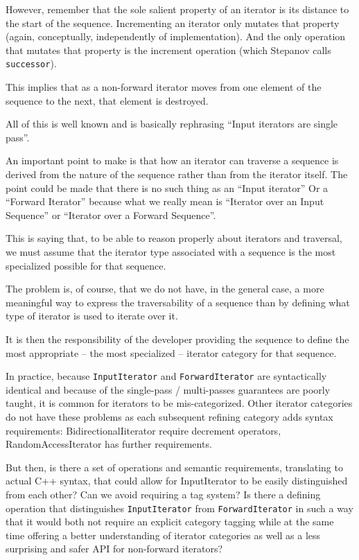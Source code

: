 \documentclass{wg21}
\begin{document}
However, remember that the sole salient property of an iterator is its
distance to the start of the sequence. Incrementing an iterator only
mutates that property (again, conceptually, independently of
implementation). And the only operation that mutates that property is
the increment operation (which Stepanov calls \texttt{successor}).

This implies that as a non-forward iterator moves from one element of
the sequence to the next, that element is destroyed.

All of this is well known and is basically rephrasing ``Input iterators
are single pass''.

An important point to make is that how an iterator can traverse a
sequence is derived from the nature of the sequence rather than from the
iterator itself. The point could be made that there is no such thing as
an ``Input iterator'' Or a ``Forward Iterator'' because what we really
mean is ``Iterator over an Input Sequence'' or ``Iterator over a Forward
Sequence''.

This is saying that, to be able to reason properly about iterators and
traversal, we must assume that the iterator type associated with a
sequence is the most specialized possible for that sequence.

The problem is, of course, that we do not have, in the general case, a
more meaningful way to express the traversability of a sequence than by
defining what type of iterator is used to iterate over it.

It is then the responsibility of the developer providing the sequence to
define the most appropriate -- the most specialized -- iterator category
for that sequence.

In practice, because \texttt{InputIterator} and \texttt{ForwardIterator}
are syntactically identical and because of the single-pass /
multi-passes guarantees are poorly taught, it is common for iterators to
be mis-categorized. Other iterator categories do not have these problems
as each subsequent refining category adds syntax requirements:
BidirectionalIiterator require decrement operators, RandomAccessIterator
has further requirements.

But then, is there a set of operations and semantic requirements,
translating to actual C++ syntax, that could allow for InputIterator to
be easily distinguished from each other? Can we avoid requiring a tag
system? Is there a defining operation that distinguishes
\texttt{InputIterator} from \texttt{ForwardIterator} in such a way that
it would both not require an explicit category tagging while at the same
time offering a better understanding of iterator categories as well as a
less surprising and safer API for non-forward iterators?
\end{document}
